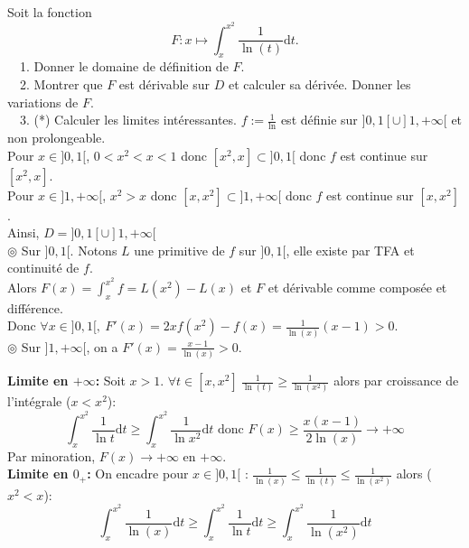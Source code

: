 \documentclass[11pt]{article}
\newcommand{\0}{\varnothing}
\newcommand*{\n}{\\[0.2cm]}
\newcommand{\dt}{\textrm{d}t}
\begin{document}
\begin{ex}{}{}
    Soit la fonction
    \begin{equation*}
        F:x\mapsto\int_x^{x^2}\frac{1}{\ln(t)}\dt.
    \end{equation*}
    \-\ ~1. Donner le domaine de définition de $F$.\\
    \-\ ~2. Montrer que $F$ est dérivable sur $D$ et calculer sa dérivée. Donner les variations de $F$.\\
    \-\ ~3. (*) Calculer les limites intéressantes.
    \tcblower
     $f:=\frac{1}{\ln}$ est définie sur $]0,1[\cup]1,+\infty[$ et non prolongeable.\\
    Pour $x\in]0,1[$, $0<x^2<x<1$ donc $[x^2,x]\subset]0,1[$ donc $f$ est continue sur $[x^2,x]$.\\
    Pour $x\in]1,+\infty[$, $x^2>x$ donc $[x,x^2]\subset]1,+\infty[$ donc $f$ est continue sur $[x,x^2]$.\\
    Ainsi, $D=]0,1[\cup]1,+\infty[$\n
     $\circledcirc$ Sur $]0,1[$. Notons $L$ une primitive de $f$ sur $]0,1[$, elle existe par TFA et continuité de $f$.\\
    Alors $F(x)=\int_x^{x^2}f=L(x^2)-L(x)$ et $F$ et dérivable comme composée et différence.\\
    Donc $\forall x \in ]0,1[, ~ F'(x)=2xf(x^2) - f(x)=\frac{1}{\ln(x)}(x-1)>0$.\\
    $\circledcirc$ Sur $]1,+\infty[$, on a $F'(x)=\frac{x-1}{\ln(x)}>0$.
    \begin{center}
    \end{center}
     \textbf{Limite en $+\infty$:} Soit $x>1$. $\forall t\in[x,x^2] ~ \frac{1}{\ln(t)}\geq\frac{1}{\ln(x^2)}$ alors par croissance de l'intégrale ($x<x^2$):
    \begin{equation*}
        \int_x^{x^2}\frac{1}{\ln t}\dt\geq\int_x^{x^2}\frac{1}{\ln x^2}\dt \text{ donc } F(x)\geq\frac{x(x-1)}{2\ln(x)}\to+\infty
    \end{equation*}
    Par minoration, $F(x)\to+\infty$ en $+\infty$.\n
    \textbf{Limite en $0_+$:} On encadre pour $x\in]0,1[$ : $\frac{1}{\ln(x)}\leq\frac{1}{\ln(t)}\leq\frac{1}{\ln(x^2)}$ alors ($x^2<x$):
    \begin{equation*}
        \int_x^{x^2}\frac{1}{\ln(x)}\dt\geq\int_x^{x^2}\frac{1}{\ln t}\dt\geq\int_x^{x^2}\frac{1}{\ln(x^2)}\dt

\end{equation*}
\end{ex}
\end{document}
